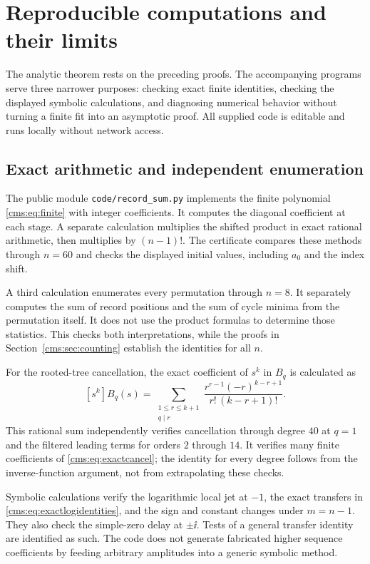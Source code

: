 \section{Reproducible computations and their limits}\label{cms:sec:reproduction}
The analytic theorem rests on the preceding proofs. The accompanying programs serve three narrower purposes: checking exact finite identities, checking the displayed symbolic calculations, and diagnosing numerical behavior without turning a finite fit into an asymptotic proof. All supplied code is editable and runs locally without network access.

\subsection{Exact arithmetic and independent enumeration}
The public module \texttt{code/record\_sum.py} implements the finite polynomial \eqref{cms:eq:finite} with integer coefficients. It computes the diagonal coefficient at each stage. A separate calculation multiplies the shifted product in exact rational arithmetic, then multiplies by $(n-1)!$. The certificate compares these methods through $n=60$ and checks the displayed initial values, including $a_0$ and the index shift.

A third calculation enumerates every permutation through $n=8$. It separately computes the sum of record positions and the sum of cycle minima from the permutation itself. It does not use the product formulas to determine those statistics. This checks both interpretations, while the proofs in Section~\ref{cms:sec:counting} establish the identities for all $n$.

For the rooted-tree cancellation, the exact coefficient of $s^k$ in $B_q$ is calculated as
\begin{equation}\label{cms:eq:exacttreecoefficient}
[s^k]B_q(s)=
\sum_{\substack{1\leq r\leq k+1\\q\mid r}}
\frac{r^{r-1}(-r)^{k-r+1}}{r!\,(k-r+1)!}.
\end{equation}
This rational sum independently verifies cancellation through degree $40$ at $q=1$ and the filtered leading terms for orders $2$ through $14$. It verifies many finite coefficients of \eqref{cms:eq:exactcancel}; the identity for every degree follows from the inverse-function argument, not from extrapolating these checks.

Symbolic calculations verify the logarithmic local jet at $-1$, the exact transfers in \eqref{cms:eq:exactlogidentities}, and the sign and constant changes under $m=n-1$. They also check the simple-zero delay at $\pm\ii$. Tests of a general transfer identity are identified as such. The code does not generate fabricated higher sequence coefficients by feeding arbitrary amplitudes into a generic symbolic method.

